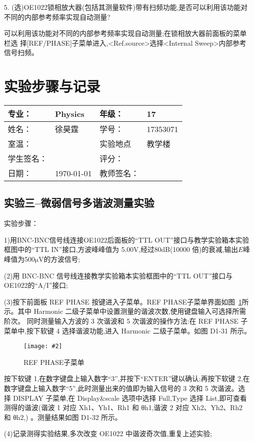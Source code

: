 \documentclass[11pt,a4paper]{ctexart}
\newcommand{\cpic}[2]{
\begin{center}
\texttt{[image: \#2]}
\end{center}
}
\newcommand{\cpicn}[3]
{
\begin{figure}[H]
\cpic{#1}{#2}
\caption{\color{red}#3\label{#2}}
\end{figure}
}
\begin{document}
5. (选)OE1022锁相放大器(包括其测量软件)带有扫频功能,是否可以利用该功能对不同的内部参考频率实现自动测量?

可以利用该功能对不同的内部参考频率实现自动测量;在锁相放大器前面板的菜单栏选
择[REF/PHASE]子菜单进入,<Ref.source>选择<Internal Sweep>内部参考信号扫频。

\newpage
\section{实验步骤与记录}
\begin{tabular}{|p{8em}|p{8em}|p{8em}|p{8em}|}
	\hline 
	专业：     &Physics       &年级：      & 17     \\
	\hline
	姓名：& 徐昊霆 &学号：&17353071  \\
	\hline
	室温：&                    &实验地点 & 教学楼 \\
	\hline	
	学生签名： & & 评分： & \\
	\hline
	日期： & \today & 教师签名：&  \\
	\hline
\end{tabular}

\subsection{实验三--微弱信号多谐波测量实验}
实验步骤：

1)用BNC-BNC信号线连接OE1022后面板的“TTL OUT”接口与教学实验箱本实验框图中的“TTL IN”接口,方波峰峰值为 5.00V,经过80dB(10000 倍)的衰减,输出$E$峰峰值为500$\mathrm{\mu V}$的方波信号;

(2)用 BNC-BNC 信号线连接教学实验箱本实验框图中的“TTL OUT”接口与OE1022的“A/I”接口;

(3)按下前面板 REF PHASE 按键进入子菜单。REF PHASE子菜单界面如图~\ref{refphase}所示。其中 Harmonic 二级子菜单中设置测量的谐波次数,使用键盘输入可选择所需阶次。
同时测量输入方波的 3 次谐波和 5 次谐波的操作方法:在 REF PHASE 子菜单中,按下软键 4 选择谐波功能,进入 Harmonic 二级子菜单。如图 D1-31 所示。
\cpicn{0.5}{refphase}{REF PHASE子菜单}

按下软键 1,在数字键盘上输入数字“3”,并按下“ENTER”键以确认;再按下软键 2,在
数字键盘上输入数字“5”,此时测量出来的值即为输入信号的 3 次和 5 次谐波。选择 DISPLAY
子菜单,在 Display\&scale 选项中选择 Full,Type 选择 List,即可查看测得的谐波(谐波 1 对应 Xh1、Yh1、Rh1 和 θh1,谐波 2 对应 Xh2、Yh2、Rh2 和 θh2,)
。测量结果如图 D1-32 所示。

(4)记录测得实验结果,多次改变 OE1022 中谐波奇次值,重复上述实验;
\end{document}
